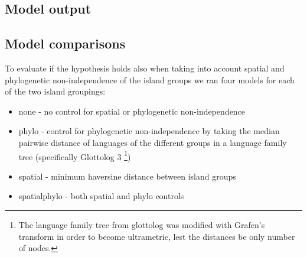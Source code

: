 \documentclass[unnumsec,webpdf,modern,medium]{oup-authoring-template}
\begin{document}


\newpage
\subsection{Model output}











\FloatBarrier
\newpage
\subsection{Model comparisons}
\label{appendix_model_fit_scores}
To evaluate if the hypothesis holds also when taking into account spatial and phylogenetic non-independence of the island groups we ran four models for each of the two island groupings:

\begin{itemize}

    \item none - no control for spatial or phylogenetic non-independence
    \item phylo - control for phylogenetic non-independence by taking the median pairwise distance of languages of the different groups in a language family tree (specifically Glottolog 3 \citet{glottolog3}\footnote{The language family tree from glottolog was modified with Grafen's transform in order to become ultrametric, lest the distances be only number of nodes.})
    \item spatial - minimum haversine distance between island groups
    \item spatialphylo - both spatial and phylo controls
    
\end{itemize}
\end{document}
